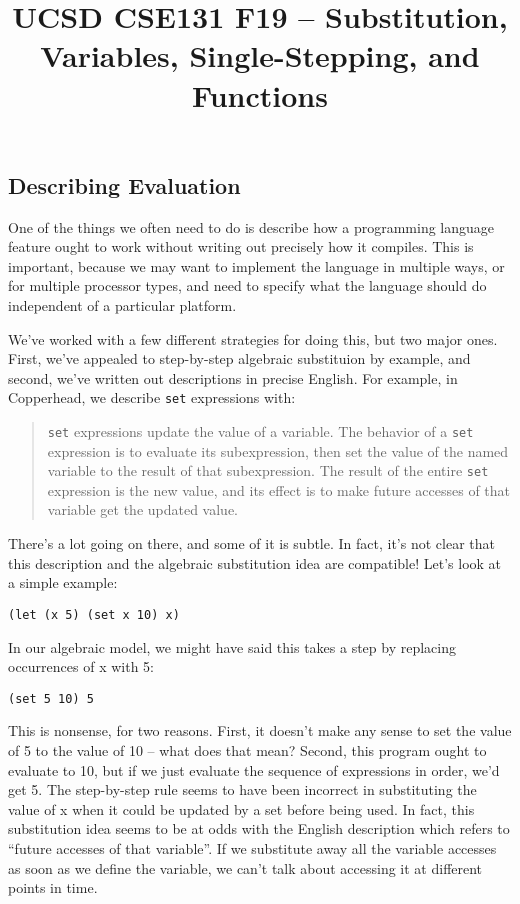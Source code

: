 \documentclass[10pt, oneside]{article}
\title{UCSD CSE131 F19 -- Substitution, Variables, Single-Stepping, and Functions}
\begin{document}
\maketitle 

\subsection*{Describing Evaluation}

One of the things we often need to do is describe how a programming language
feature ought to work without writing out precisely how it compiles. This is
important, because we may want to implement the language in multiple ways, or
for multiple processor types, and need to specify what the language should do
independent of a particular platform.

We've worked with a few different strategies for doing this, but two major
ones. First, we've appealed to step-by-step algebraic substituion by example,
and second, we've written out descriptions in precise English. For example,
in Copperhead, we describe \texttt{set} expressions with:

\begin{quote}
  \texttt{set} expressions update the value of a variable. The behavior
  of a \texttt{set} expression is to evaluate its subexpression, then set the
  value of the named variable to the result of that subexpression. The result
  of the entire \texttt{set} expression is the new value, and its effect is to
  make future accesses of that variable get the updated value.
\end{quote}

There's a lot going on there, and some of it is subtle. In fact, it's not
clear that this description and the algebraic substitution idea are
compatible! Let's look at a simple example:

\begin{lstlisting}
(let (x 5) (set x 10) x)
\end{lstlisting}

In our algebraic model, we might have said this takes a step by replacing
occurrences of x with 5:

\begin{lstlisting}
(set 5 10) 5
\end{lstlisting}

This is nonsense, for two reasons. First, it doesn't make any sense to set
the value of 5 to the value of 10 -- what does that mean? Second, this
program ought to evaluate to 10, but if we just evaluate the sequence of
expressions in order, we'd get 5. The step-by-step rule seems to have been
incorrect in substituting the value of x when it could be updated by a set
before being used. In fact, this substitution idea seems to be at odds with
the English description which refers to ``future accesses of that variable''.
If we substitute away all the variable accesses as soon as we define the
variable, we can't talk about accessing it at different points in time.
\end{document}
